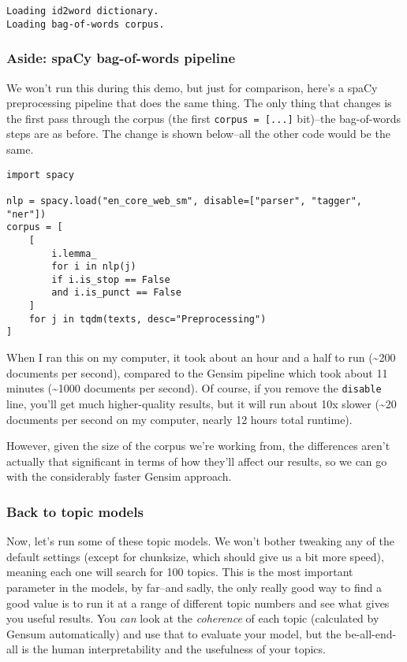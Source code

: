 \documentclass[11pt]{article}
\begin{document}
    \begin{Verbatim}[commandchars=\\\{\}]
Loading id2word dictionary.
Loading bag-of-words corpus.

    \end{Verbatim}

    \hypertarget{aside-spacy-bag-of-words-pipeline}{%
\subsubsection{Aside: spaCy bag-of-words
pipeline}\label{aside-spacy-bag-of-words-pipeline}}

We won't run this during this demo, but just for comparison, here's a
spaCy preprocessing pipeline that does the same thing. The only thing
that changes is the first pass through the corpus (the first
\texttt{corpus\ =\ {[}...{]}} bit)--the bag-of-words steps are as
before. The change is shown below--all the other code would be the same.

\begin{verbatim}
import spacy

nlp = spacy.load("en_core_web_sm", disable=["parser", "tagger", "ner"])
corpus = [
    [
        i.lemma_
        for i in nlp(j)
        if i.is_stop == False
        and i.is_punct == False
    ]
    for j in tqdm(texts, desc="Preprocessing")
]
\end{verbatim}

When I ran this on my computer, it took about an hour and a half to run
(\textasciitilde{}200 documents per second), compared to the Gensim
pipeline which took about 11 minutes (\textasciitilde{}1000 documents
per second). Of course, if you remove the \texttt{disable} line, you'll
get much higher-quality results, but it will run about 10x slower
(\textasciitilde{}20 documents per second on my computer, nearly 12
hours total runtime).

However, given the size of the corpus we're working from, the
differences aren't actually that significant in terms of how they'll
affect our results, so we can go with the considerably faster Gensim
approach.

    \hypertarget{back-to-topic-models}{%
\subsubsection{Back to topic models}\label{back-to-topic-models}}

Now, let's run some of these topic models. We won't bother tweaking any
of the default settings (except for chunksize, which should give us a
bit more speed), meaning each one will search for 100 topics. This is
the most important parameter in the models, by far--and sadly, the only
really good way to find a good value is to run it at a range of
different topic numbers and see what gives you useful results. You
\emph{can} look at the \emph{coherence} of each topic (calculated by
Gensum automatically) and use that to evaluate your model, but the
be-all-end-all is the human interpretability and the usefulness of your
topics.
\end{document}
